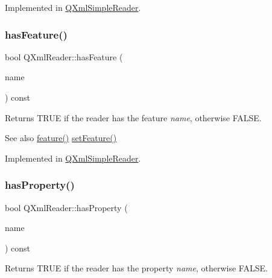 Implemented in \mbox{\hyperlink{class_q_xml_simple_reader_ae6b1a973ea59fc35b75d45ac5e30a303}{Q\+Xml\+Simple\+Reader}}.

\mbox{\label{class_q_xml_reader_ac9835c64b96d42b60f0bec5962153582}} 
\subsubsection{\texorpdfstring{hasFeature()}{hasFeature()}}
{\footnotesize\ttfamily bool Q\+Xml\+Reader\+::has\+Feature (\begin{DoxyParamCaption}\item[{const \mbox{\hyperlink{class_q_string}{Q\+String}} \&}]{name }\end{DoxyParamCaption}) const\hspace{0.3cm}{\ttfamily [pure virtual]}}

Returns {\ttfamily T\+R\+UE} if the reader has the feature {\itshape name}, otherwise F\+A\+L\+SE.

\begin{DoxySeeAlso}{See also}
\mbox{\hyperlink{class_q_xml_reader_ab4d90af8a5440668582f53e47e9a81d6}{feature()}} \mbox{\hyperlink{class_q_xml_reader_a6673b0e33ef628df75410fabdafa3684}{set\+Feature()}} 
\end{DoxySeeAlso}


Implemented in \mbox{\hyperlink{class_q_xml_simple_reader_a6066183e6cbbab403e5cdf69a1410157}{Q\+Xml\+Simple\+Reader}}.

\mbox{\label{class_q_xml_reader_ac26bf52bfab045196e8adf980e92bab6}} 
\subsubsection{\texorpdfstring{hasProperty()}{hasProperty()}}
{\footnotesize\ttfamily bool Q\+Xml\+Reader\+::has\+Property (\begin{DoxyParamCaption}\item[{const \mbox{\hyperlink{class_q_string}{Q\+String}} \&}]{name }\end{DoxyParamCaption}) const\hspace{0.3cm}{\ttfamily [pure virtual]}}

Returns T\+R\+UE if the reader has the property {\itshape name}, otherwise F\+A\+L\+SE.

